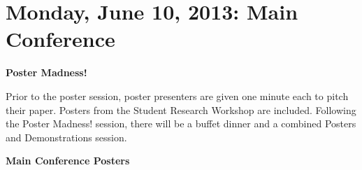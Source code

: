\chapter{Monday, June 10, 2013: Main Conference}
\thispagestyle{emptyheader}

\newpage
\newpage

{}


\newpage



\vspace{1em}\par\centerline{\bfseries\Large Poster Madness!}\vspace{1em}\par
{}

Prior to the poster session, poster presenters are given one minute each to pitch their
paper. Posters from the Student Research Workshop are included. Following the Poster Madness!
session, there will be a buffet dinner and a combined Posters and Demonstrations session.

\noindent
\vspace{1em}\par\centerline{\bfseries\large Main Conference Posters}\vspace{1em}\par

\noindent


